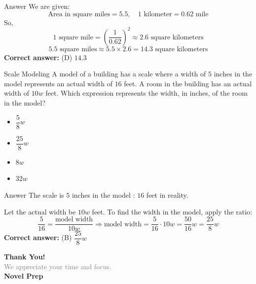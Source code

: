 \documentclass{beamer}
\begin{document}
\begin{frame}{Answer}
We are given:
\[
\text{Area in square miles} = 5.5, \quad 1 \text{ kilometer} = 0.62 \text{ mile}
\]
So,
\[
1 \text{ square mile} = \left(\dfrac{1}{0.62}\right)^2 \approx 2.6 \text{ square kilometers}
\]
\[
5.5 \text{ square miles} \approx 5.5 \times 2.6 = 14.3 \text{ square kilometers}
\]
\textbf{Correct answer:} (D) $14.3$
\end{frame}


\begin{frame}{Scale Modeling}
A model of a building has a scale where a width of $5$ inches in the model represents an actual width of $16$ feet. A room in the building has an actual width of $10w$ feet. Which expression represents the width, in inches, of the room in the model?
\begin{itemize}
    \item[(A)] $\dfrac{5}{8}w$
    \item[(B)] $\dfrac{25}{8}w$
    \item[(C)] $8w$
    \item[(D)] $32w$
\end{itemize}
\end{frame}


\begin{frame}{Answer}
The scale is $5$ inches in the model : $16$ feet in reality.

Let the actual width be $10w$ feet. To find the width in the model, apply the ratio:
\[
\frac{5}{16} = \frac{\text{model width}}{10w} \Rightarrow \text{model width} = \frac{5}{16} \cdot 10w = \frac{50}{16}w = \frac{25}{8}w
\]
\textbf{Correct answer:} (B) $\dfrac{25}{8}w$
\end{frame}








\begin{frame}{}

    \centering
    \vspace{5em}

    {\Huge \textbf{\textcolor{novelPurple}{Thank You!}}} \\[1em]
    {\large \textcolor{gray}{We appreciate your time and focus.}} \\[3em]

    {\LARGE \textbf{\textcolor{novelPurple}{\textsf{Novel Prep}}}}

    \vfill
\end{frame}
\end{document}
